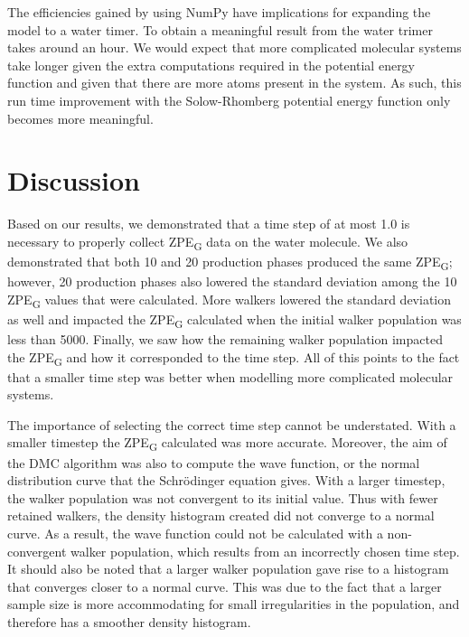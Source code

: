 \documentclass[journal=jacsat,manuscript=article]{achemso}
\begin{document}
The efficiencies gained by using NumPy have implications for expanding the model to a water timer. To obtain a meaningful result from the water trimer takes around an hour. We would expect that more complicated molecular systems take longer given the extra computations required in the potential energy function and given that there are more atoms present in the system. As such, this run time improvement with the Solow-Rhomberg potential energy function only becomes more meaningful.

\section{Discussion}

Based on our results, we demonstrated that a time step of at most 1.0 is necessary to properly collect ZPE\textsubscript{G} data on the water molecule. We also demonstrated that both 10 and 20 production phases produced the same ZPE\textsubscript{G}; however, 20 production phases also lowered the standard deviation among the 10 ZPE\textsubscript{G} values that were calculated. More walkers lowered the standard deviation as well and impacted the ZPE\textsubscript{G} calculated when the initial walker population was less than 5000. Finally, we saw how the remaining walker population impacted the ZPE\textsubscript{G} and how it corresponded to the time step. All of this points to the fact that a smaller time step was better when modelling more complicated molecular systems. 

The importance of selecting the correct time step cannot be understated. With a smaller timestep the ZPE\textsubscript{G} calculated was more accurate. Moreover, the aim of the DMC algorithm was also to compute the wave function, or the normal distribution curve that the Schr\"odinger equation gives. With a larger timestep, the walker population was not convergent to its initial value. Thus with fewer retained walkers, the density histogram created did not converge to a normal curve. As a result, the wave function could not be calculated with a non-convergent walker population, which results from an incorrectly chosen time step. It should also be noted that a larger walker population gave rise to a histogram that converges closer to a normal curve. This was due to the fact that a larger sample size is more accommodating for small irregularities in the population, and therefore has a smoother density histogram. 
\end{document}
